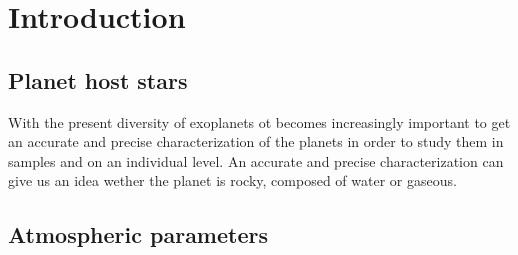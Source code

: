 \chapter{Introduction}


\section{Planet host stars}
\label{sec:Planet_host_stars}
With the present diversity of exoplanets ot becomes increasingly important
to get an accurate and precise characterization of the planets in order to
study them in samples and on an individual level. An accurate and precise
characterization can give us an idea wether the planet is rocky, composed
of water or gaseous.








\section{Atmospheric parameters}
\label{sec:Atmospheric_parameters}
